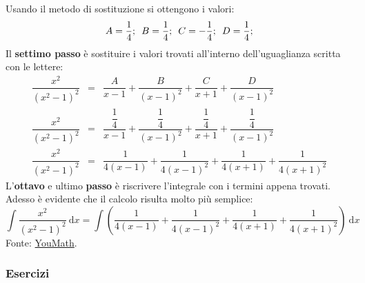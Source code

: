 \documentclass[a4paper]{article}
\begin{document}
	Usando il metodo di sostituzione si ottengono i valori:
	\begin{equation*}
		A=\dfrac{1}{4}; \hspace{.5em}
		B=\dfrac{1}{4}; \hspace{.5em}
		C=-\dfrac{1}{4}; \hspace{.5em}
		D=\dfrac{1}{4};
	\end{equation*}
	Il \textbf{settimo passo} è sostituire i valori trovati all'interno dell'uguaglianza scritta con le lettere:
	\begin{equation*}
		\begin{array}{rcl}
			\dfrac{x^{2}}{\left(x^{2} - 1\right)^{2}} &=& \dfrac{A}{x-1} + \dfrac{B}{\left(x-1\right)^{2}} + \dfrac{C}{x+1} + \dfrac{D}{\left(x-1\right)^{2}} \\ [2em]
			\dfrac{x^{2}}{\left(x^{2} - 1\right)^{2}} &=& \dfrac{\dfrac{1}{4}}{x-1} + \dfrac{\dfrac{1}{4}}{\left(x-1\right)^{2}} + \dfrac{\dfrac{1}{4}}{x+1} + \dfrac{\dfrac{1}{4}}{\left(x-1\right)^{2}} \\ [2em]
			\dfrac{x^{2}}{\left(x^{2} - 1\right)^{2}} &=& \dfrac{1}{4\left(x-1\right)} + \dfrac{1}{4\left(x-1\right)^{2}} + \dfrac{1}{4\left(x+1\right)} + \dfrac{1}{4\left(x+1\right)^{2}}
		\end{array}
	\end{equation*}
	L'\textbf{ottavo} e ultimo \textbf{passo} è riscrivere l'integrale con i termini appena trovati. Adesso è evidente che il calcolo risulta molto più semplice:
	\begin{equation*}
		\displaystyle\int\dfrac{x^{2}}{\left(x^{2} - 1\right)^{2}} \: \mathrm{d}x = \int \left(
			\dfrac{1}{4\left(x-1\right)} + \dfrac{1}{4\left(x-1\right)^{2}} + \dfrac{1}{4\left(x+1\right)} + \dfrac{1}{4\left(x+1\right)^{2}}
		\right) \: \mathrm{d}x
	\end{equation*}
	Fonte: \href{https://www.youmath.it/forum/sezione-speciale-per-i-topic-a-pagamento/94247-metodo-delle-frazioni-parziali-applicato-agli-integrali-indefiniti.html}{YouMath}.\newpage

	\subsubsection{Esercizi}\label{subsubsection: esercizi (calcolo differenziale e integrale)}
\end{document}
